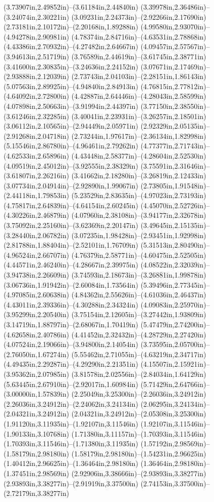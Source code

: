(3.73907in,2.49852in)--(3.61184in,2.44840in) (3.39978in,2.36486in)--(3.24074in,2.30221in) (3.09231in,2.24373in)--(2.92266in,2.17690in) (2.73181in,2.10172in)--(2.20168in,1.89288in) (4.99580in,2.93070in)--(4.94278in,2.90981in) (4.78374in,2.84716in)--(4.63531in,2.78868in) (4.43386in,2.70932in)--(4.27482in,2.64667in) (4.09457in,2.57567in)--(3.94613in,2.51719in) (3.76589in,2.44619in)--(3.61745in,2.38771in) (3.41600in,2.30835in)--(3.24636in,2.24152in) (3.07671in,2.17469in)--(2.93888in,2.12039in) (2.73743in,2.04103in)--(2.28151in,1.86143in) (5.07563in,2.89925in)--(4.94840in,2.84913in) (4.76815in,2.77812in)--(4.64092in,2.72800in) (4.42887in,2.64446in)--(4.28043in,2.58599in) (4.07898in,2.50663in)--(3.91994in,2.44397in) (3.77150in,2.38550in)--(3.61246in,2.32285in) (3.40041in,2.23931in)--(3.26257in,2.18501in) (3.06112in,2.10565in)--(2.94449in,2.05971in) (2.92329in,2.05135in)--(2.91268in,2.04718in) (2.73244in,1.97617in)--(2.36134in,1.82998in) (5.15546in,2.86780in)--(4.96461in,2.79262in) (4.77377in,2.71743in)--(4.62533in,2.65896in) (4.43448in,2.58377in)--(4.28604in,2.52530in) (4.09519in,2.45012in)--(3.92555in,2.38329in) (3.75591in,2.31646in)--(3.61807in,2.26216in) (3.41662in,2.18280in)--(3.26819in,2.12433in) (3.07734in,2.04914in)--(2.92890in,1.99067in) (2.73805in,1.91548in)--(2.44118in,1.79853in) (5.23529in,2.83635in)--(4.97023in,2.73193in) (4.75817in,2.64839in)--(4.64154in,2.60245in) (4.45070in,2.52726in)--(4.30226in,2.46879in) (4.07960in,2.38108in)--(3.94177in,2.32678in) (3.75092in,2.25160in)--(3.62369in,2.20147in) (3.49645in,2.15135in)--(3.28440in,2.06782in) (3.07235in,1.98428in)--(2.93451in,1.92998in) (2.81788in,1.88404in)--(2.52101in,1.76709in) (5.31513in,2.80490in)--(4.96524in,2.66707in) (4.76379in,2.58771in)--(4.60475in,2.52505in) (4.44571in,2.46240in)--(4.28667in,2.39975in) (4.08522in,2.32039in)--(3.94738in,2.26609in) (3.74593in,2.18673in)--(3.26881in,1.99878in) (3.06736in,1.91942in)--(2.60084in,1.73564in) (5.39496in,2.77345in)--(4.97085in,2.60638in) (4.84362in,2.55626in)--(4.61036in,2.46437in) (4.43011in,2.39336in)--(4.30288in,2.34324in) (4.09083in,2.25970in)--(3.95299in,2.20540in) (3.75154in,2.12605in)--(3.27442in,1.93809in) (3.14719in,1.88797in)--(2.68067in,1.70419in) (5.47479in,2.74200in)--(4.62658in,2.40786in) (4.41452in,2.32432in)--(4.28729in,2.27420in) (4.07524in,2.19066in)--(3.94800in,2.14054in) (3.73595in,2.05700in)--(2.76050in,1.67274in) (5.55462in,2.71055in)--(4.63219in,2.34717in) (4.49435in,2.29287in)--(4.29290in,2.21351in) (4.15507in,2.15921in)--(3.95362in,2.07985in) (3.81578in,2.02556in)--(2.84034in,1.64129in) (5.63445in,2.67910in)--(2.92017in,1.60984in) (5.71429in,2.64766in)--(3.00000in,1.57839in) (2.25049in,3.25300in)--(2.26036in,3.24912in) (2.26036in,3.24912in)--(2.24062in,3.24134in) (2.06295in,3.24134in)--(2.04321in,3.24912in) (2.04321in,3.24912in)--(2.05308in,3.25300in) (1.91120in,3.11935in)--(1.92107in,3.11546in) (1.92107in,3.11546in)--(1.90133in,3.10768in) (1.71380in,3.11157in)--(1.70393in,3.11546in) (1.70393in,3.11546in)--(1.71380in,3.11935in) (1.57192in,2.98569in)--(1.58179in,2.98180in) (1.58179in,2.98180in)--(1.54231in,2.96625in) (1.40412in,2.96625in)--(1.36464in,2.98180in) (1.36464in,2.98180in)--(1.37451in,2.98569in) (2.92906in,3.38666in)--(2.93893in,3.38277in) (2.93893in,3.38277in)--(2.91919in,3.37500in) (2.74153in,3.37500in)--(2.72179in,3.38277in) 